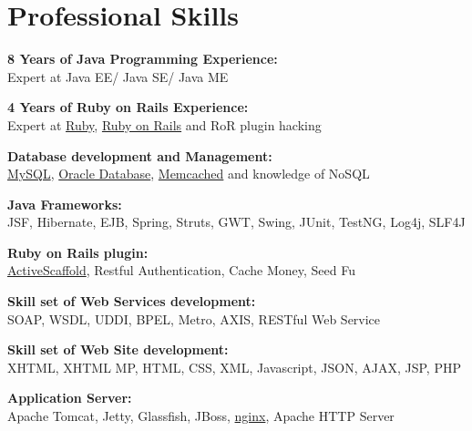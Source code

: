 
\section{Professional Skills} 
%
{\textbf{8 Years of Java Programming Experience:}}\\
Expert at Java EE/ Java SE/ Java ME

\blankline

{\textbf{4 Years of Ruby \nolinebreak on \nolinebreak Rails Experience:}}\\
Expert at 
\href{http://www.ruby-lang.org/en/}{Ruby}, 
\href{http://rubyonrails.org/}{Ruby on Rails} and RoR plugin hacking

\blankline

{\textbf{Database development and Management:}}\\
\href{http://www.mysql.com/}{MySQL}, 
\href{http://www.oracle.com/us/products/database/index.html}{Oracle Database}, 
\href{http://memcached.org/}{Memcached} and knowledge of NoSQL

\blankline

{\textbf{Java Frameworks:}}\\
JSF, Hibernate, EJB, Spring, Struts, GWT, Swing, JUnit, TestNG, Log4j, SLF4J

\blankline

{\textbf{Ruby \nolinebreak on \nolinebreak Rails plugin:}}\\
\href{http://activescaffold.com/}{ActiveScaffold},
Restful Authentication,
Cache Money,
Seed Fu

\blankline

{\textbf{Skill set of Web Services development:}}\\
SOAP, WSDL, UDDI, BPEL, Metro, AXIS, RESTful Web Service


\blankline

{\textbf{Skill set of Web Site development:}}\\
XHTML, XHTML MP, HTML, CSS, XML, Javascript, JSON, AJAX, JSP, PHP 

\blankline

{\textbf{Application Server:}}\\
Apache Tomcat, Jetty, Glassfish, JBoss, 
\href{http://nginx.net/}{nginx}, Apache HTTP Server

